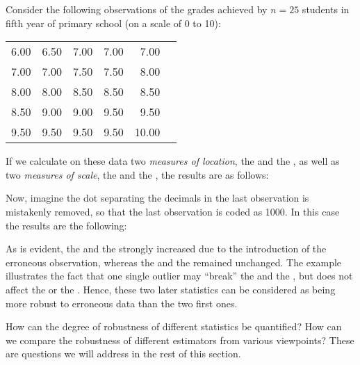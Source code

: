 \begin{stexample}
    Consider the following observations of the grades achieved by $n = 25$ students
    in fifth year of primary school (on a scale of 0 to 10):                       
    
    \begin{center}
    \begin{tabular}{rrrrrr}%
    6.00 & 6.50 & 7.00 & 7.00 & 7.00\\
    7.00 & 7.00 & 7.50 & 7.50 & 8.00\\
    8.00 & 8.00 & 8.50 & 8.50 & 8.50\\
    8.50 & 9.00 & 9.00 & 9.50 & 9.50\\
    9.50 & 9.50 & 9.50 & 9.50 & 10.00
    \end{tabular}
    \end{center}
    
    If we calculate on these data two \emph{measures of location}, the  and the
    , as well as two \emph{measures of scale}, the
     and the , the results
    are as follows:
    
\begin{stlog}

\end{stlog}
    
    Now, imagine the dot separating the decimals in the last observation is
    mistakenly removed, so that the last observation is coded as 1000. In this 
    case the results are the following:
    
\begin{stlog}

\end{stlog}
    
    As is evident, the  and the  strongly
    increased due to the introduction of the erroneous observation, whereas
    the  and the  remained unchanged.
    The example illustrates the fact that one single outlier may “break” the
     and the , but does not affect the
     or the . Hence, these two later
    statistics can be considered as being more robust to erroneous data than
    the two first ones.

\end{stexample}

How can the degree of robustness of different statistics be quantified? How can
we compare the robustness of different estimators from various viewpoints?
These are questions we will address in the rest of this section.

